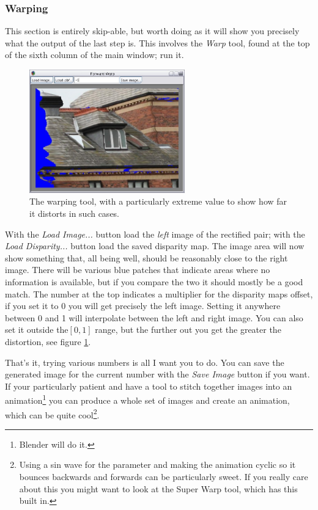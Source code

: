 \documentclass[10pt,a4paper,twoside]{article}
\begin{document}
\subsubsection {Warping}
This section is entirely skip-able, but worth doing as it will show you precisely what the output of the last step is. This involves the \emph{Warp} tool, found at the top of the sixth column of the main window; run it.

\begin{figure}
 \centering
 \includegraphics[width=0.6\textwidth]{screenshots/warp}
 \caption{The warping tool, with a particularly extreme value to show how far it distorts in such cases.}
 \label{fig:warp}
\end{figure}

With the \emph{Load Image...} button load the \emph{left} image of the rectified pair; with the \emph{Load Disparity...} button load the saved disparity map. The image area will now show something that, all being well, should be reasonably close to the right image. There will be various blue patches that indicate areas where no information is available, but if you compare the two it should mostly be a good match. The number at the top indicates a multiplier for the disparity maps offset, if you set it to 0 you will get precisely the left image. Setting it anywhere between 0 and 1 will interpolate between the left and right image. You can also set it outside the$[0,1]$ range, but the further out you get the greater the distortion, see figure \ref{fig:warp}.

That's it, trying various numbers is all I want you to do. You can save the generated image for the current number with the \emph{Save Image} button if you want. If your particularly patient and have a tool to stitch together images into an animation\footnote{Blender will do it.} you can produce a whole set of images and create an animation, which can be quite cool\footnote{Using a sin wave for the parameter and making the animation cyclic so it bounces backwards and forwards can be particularly sweet. If you really care about this you might want to look at the Super Warp tool, which has this built in.}.
\end{document}
